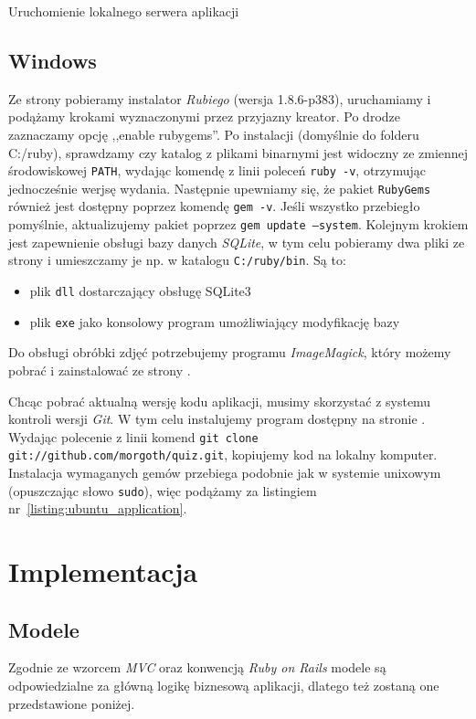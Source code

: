 \documentclass[12pt,twoside]{report}
\begin{document}
\begin{listing}
  
  \caption{Uruchomienie lokalnego serwera aplikacji}
  \label{listing:ubuntu_start_server}
\end{listing}

\section{Windows}
Ze strony \cite{ruby-windows} pobieramy instalator \emph{Rubiego} (wersja 1.8.6-p383),
uruchamiamy i podążamy krokami wyznaczonymi przez przyjazny kreator.
Po drodze zaznaczamy opcję ,,enable rubygems''. Po instalacji
(domyślnie do folderu C:/ruby), sprawdzamy czy katalog z plikami binarnymi jest widoczny
ze zmiennej środowiskowej \texttt{PATH}, wydając komendę z linii poleceń \texttt{ruby~-v},
otrzymując jednocześnie werjsę wydania. Następnie upewniamy się, że pakiet
\texttt{RubyGems} również jest dostępny poprzez komendę \texttt{gem~-v}. Jeśli wszystko
przebiegło pomyślnie, aktualizujemy pakiet poprzez \texttt{gem~update~--system}. Kolejnym
krokiem jest zapewnienie obsługi bazy danych \emph{SQLite}, w tym celu pobieramy dwa pliki
ze strony \cite{sqlite-windows} i umieszczamy je np. w katalogu \texttt{C:/ruby/bin}. Są
to:

\begin{itemize}
  \item{plik \texttt{dll} dostarczający obsługę SQLite3}
  \item{plik \texttt{exe} jako konsolowy program umożliwiający modyfikację bazy}
\end{itemize}


Do obsługi obróbki zdjęć potrzebujemy programu \emph{ImageMagick}, który możemy pobrać i
zainstalować ze strony \cite{imagemagick-windows}.


Chcąc pobrać aktualną wersję kodu aplikacji, musimy skorzystać z systemu kontroli wersji
\emph{Git}. W tym celu instalujemy program dostępny na stronie \cite{git-windows}.
Wydając polecenie z linii komend \texttt{git~clone git://github.com/morgoth/quiz.git},
kopiujemy kod na lokalny komputer. Instalacja wymaganych gemów przebiega podobnie jak w
systemie unixowym (opuszczając słowo \texttt{sudo}), więc podążamy za listingiem
nr~\ref{listing:ubuntu_application}.


\cleardoublepage
\chapter{Implementacja}
\section{Modele}
Zgodnie ze wzorcem \emph{MVC} oraz konwencją \emph{Ruby on Rails} modele są odpowiedzialne
za główną logikę biznesową aplikacji, dlatego też zostaną one przedstawione poniżej.
\end{document}
